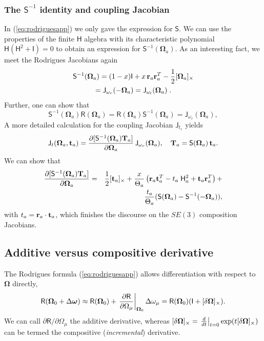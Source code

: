 \documentclass[journal]{IEEEtran}
\newcommand{\bfomega}{\boldsymbol{\omega}}
\newcommand{\bfOmega}{\boldsymbol{\Omega}}
\newcommand{\beq}{\begin{equation}}
\newcommand{\eeq}{\end{equation}}
\newcommand{\beqar}{\begin{eqnarray}}
\newcommand{\eeqar}{\end{eqnarray}}
\begin{document}
\subsubsection{The $\mathsf{S}^{-1}$ identity and coupling Jacobian}
In (\ref{eq:rodriguesapp}) we only gave the expression for $\mathsf{S}$. We can use the
properties of the finite $\mathsf{H}$ algebra with its characteristic polynomial $\mathsf{H}(\mathsf{H}^2+\mathsf{I})=0$
to obtain an expression for $\mathsf{S}^{-1}(\bfOmega_a)$. As an interesting fact, we meet the Rodrigues Jacobians again
\begin{multline}
    \mathsf{S}^{-1}(\bfOmega_a) = (1-x)\mathsf{I} + x\, {\bf r}_a{\bf r}_a^T - {1\over 2}[\bfOmega_a]_\times \\
    = \mathsf{J}_{\omega_r}(-\bfOmega_a) = \mathsf{J}_{\omega_l}(\bfOmega_a)\;.
    \label{eq:Sinvidentity}
\end{multline}
Further, one can show that
\beq
    \mathsf{S}^{-1}(\bfOmega_a)\mathsf{R}(\bfOmega_a) = \mathsf{R}(\bfOmega_a)\mathsf{S}^{-1}(\bfOmega_a) =
    \mathsf{J}_{\omega_r}(\bfOmega_a),
    \label{eq:SinvRidentity}
\eeq
A more detailed calculation for the coupling Jacobian $\mathsf{J}_{t_r}$ yields
\beq
    \mathsf{J}_{t}(\bfOmega_a,{\bf t}_a) = {\partial [\mathsf{S}^{-1}(\bfOmega_a){\bf T}_a] \over
    \partial \bfOmega_a} \, \mathsf{J}_{\omega_r}(\bfOmega_a),\quad {\bf T}_a = \mathsf{S}(\bfOmega_a) \, {\bf t}_a.
    \label{eq:couplingJacobian}
\eeq
We can show that
\beqar
    {\partial [\mathsf{S}^{-1}(\bfOmega_a){\bf T}_a] \over
    \partial \bfOmega_a} & = &
    {1\over 2}[{\bf t}_a]_\times+ {x\over\Theta_a}
    \left( {\bf r}_a{\bf t}_a^T- t_a \;\mathsf{H}^2_a + {\bf t}_a{\bf r}_a^T \right) + \nonumber \\
    && {t_a\over\Theta_a} (\mathsf{S}(\bfOmega_a)-\mathsf{S}^{-1}(-\bfOmega_a)),
    \label{eq:dSinvTdOmega}
\eeqar
with $ t_a = {\bf r}_a\cdot{\bf t}_a$, which finishes the discourse on the $SE(3)$ composition Jacobians.

\subsection{Additive versus compositive derivative}
\label{app:addvscomp}
The Rodrigues formula (\ref{eq:rodriguesapp}) allows differentiation with respect to $\bfOmega$ directly,
\beq
    \mathsf{R}(\bfOmega_0+\Delta\bfomega) \approx 
    \mathsf{R}(\bfOmega_0) + \left. {\partial\mathsf{R}\over \partial\Omega_\mu} \right|_{\bfOmega_0}
    \Delta\omega_\mu = \mathsf{R}(\bfOmega_0) ( \mathsf{I} + [\delta\bfOmega]_\times ).
    \label{eq:rodriguesder}
\eeq
We can call $\partial\mathsf{R}/ \partial\Omega_\mu$ the additive derivative, whereas 
$[\delta\bfOmega]_\times = \left.{d\over dt}\right|_{t=0} \exp( t [\delta\bfOmega]_\times )$
can be termed the compositive ({\em incremental}) derivative.
\end{document}
